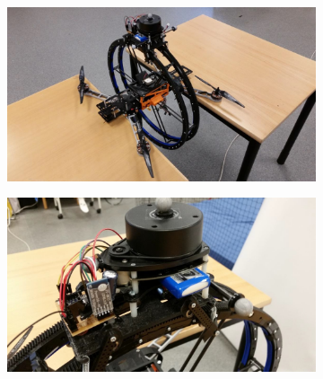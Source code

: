 \begin{figure}[h]
	\centering
	\begin{subfigure}[t]{0.49\textwidth}
		\centering
		\includegraphics[scale = 0.22]{images/prometheus2.jpg}
		\label{subfig:prometheus1}
	\end{subfigure} 
	\begin{subfigure}[t]{0.49\textwidth}
		\centering
		\includegraphics[scale = 0.2]{images/prometheus5.jpg}
		\label{subfig:prometheus2}
	\end{subfigure}
	\begin{subfigure}[t]{0.49\textwidth}
		\centering

\end{subfigure}
\end{figure}
